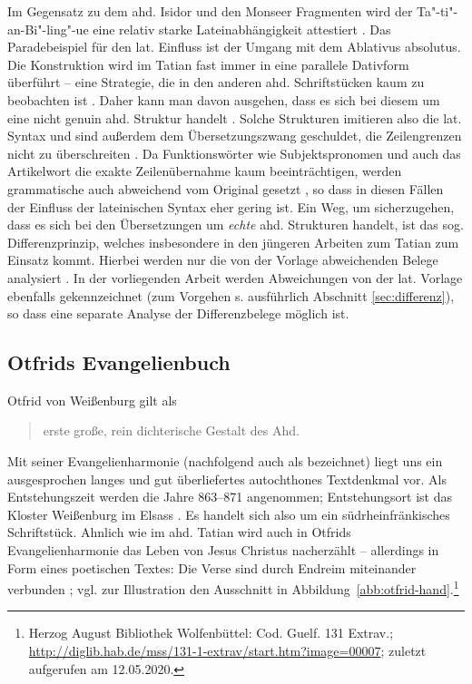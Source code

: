 Im Gegensatz zu dem ahd. Isidor und den Monseer Fragmenten wird der Ta"-ti"-an-Bi"-ling"-ue eine relativ starke Lateinabhängigkeit attestiert \parencites(){Lippert1974}[128]{Sonderegger2003}. Das Paradebeispiel für den lat. Einfluss ist der Umgang mit dem Ablativus absolutus. Die Konstruktion wird im Tatian fast immer in eine parallele Dativform überführt -- eine Strategie, die in den anderen ahd. Schriftstücken kaum zu beobachten ist \parencite[145f]{Lippert1974}. Daher kann man davon ausgehen, dass es sich bei diesem  um eine nicht genuin ahd. Struktur handelt \parencite[zur vertiefenden Diskussion s.][39--40]{Fleischer2011}. Solche Strukturen imitieren also die lat. Syntax und sind außerdem dem Übersetzungszwang geschuldet, die Zeilengrenzen nicht zu überschreiten \parencite[136]{Masser1997}. Da Funktionswörter wie Subjektspronomen und auch das Artikelwort  die exakte Zeilenübernahme kaum beeinträchtigen, werden grammatische  \parencite[43]{Fleischer2011} auch abweichend vom Original gesetzt \parencites[vgl. auch][20]{Dittmer1998}, so dass in diesen Fällen der Einfluss der lateinischen Syntax eher gering ist.  
Ein Weg, um sicherzugehen, dass es sich bei den Übersetzungen um \textit{echte} ahd. Strukturen handelt, ist das sog. Differenzprinzip, welches insbesondere in den jüngeren Arbeiten zum Tatian zum Einsatz kommt. Hierbei werden nur die von der Vorlage abweichenden Belege analysiert \parencite{Dittmer1998,Hinterholzl2005,Fleischer2008}. In der vorliegenden Arbeit werden Abweichungen von der lat. Vorlage ebenfalls gekennzeichnet (zum Vorgehen s. ausführlich Abschnitt \ref{sec:differenz}), so dass eine separate Analyse der Differenzbelege  möglich ist.  


\subsection{Otfrids Evangelienbuch}

Otfrid von Weißenburg gilt als \blockcquote[146]{Sonderegger2003}{erste große, rein dichterische Gestalt des Ahd.}. Mit seiner Evangelienharmonie (nachfolgend auch als  bezeichnet) liegt uns ein ausgesprochen langes und gut überliefertes autochthones Textdenkmal vor. Als Entstehungszeit werden die Jahre 863--871 angenommen; Entstehungsort ist das Kloster Weißenburg im Elsass \parencite[50]{Fleischer2011}. Es handelt sich also um ein südrheinfränkisches Schriftstück. Ahnlich wie im ahd. Tatian wird auch in Otfrids Evangelienharmonie das Leben von Jesus Christus nacherzählt -- allerdings in Form eines poetischen Textes: Die Verse sind durch Endreim  miteinander verbunden   \parencite[zu Variationen im Versmaß s. ausführlich][148--150] {Sonderegger2003}; vgl. zur Illustration den Ausschnitt in Abbildung~\ref{abb:otfrid-hand}.\footnote{Herzog August Bibliothek Wolfenbüttel: Cod. Guelf. 131 Extrav.; \url{http://diglib.hab.de/mss/131-1-extrav/start.htm?image=00007}; zuletzt aufgerufen am 12.05.2020.}



